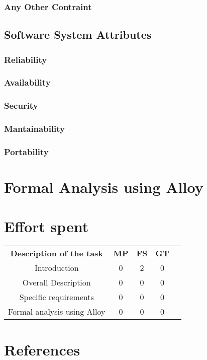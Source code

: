 \documentclass{article}
\begin{document}
\subsubsection{Any Other Contraint}
\subsection{Software System Attributes}
\subsubsection{Reliability}
\subsubsection{Availability}
\subsubsection{Security}
\subsubsection{Mantainability}
\subsubsection{Portability}

\newpage
\section{Formal Analysis using Alloy}

\newpage
\section{Effort spent}
\begin{center}
    \begin{tabular}{c|c|c|c|c}
        \hline
        \textbf{Description of the task} & \textbf{MP} & \textbf{FS} & \textbf{GT} \\
        Introduction                    & 0 & 2 & 0 \\
        Overall Description             & 0 & 0 & 0 \\
        Specific requirements           & 0 & 0 & 0 \\
        Formal analysis using Alloy     & 0 & 0 & 0 \\
    \end{tabular}
\end{center}
\section{References}
    
\end{document}
